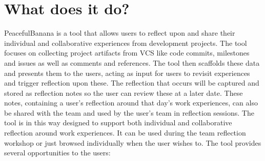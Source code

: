 \section{What does it do?}
PeacefulBanana is a tool that allows users to reflect upon and share their individual and collaborative experiences from development projects. The tool focuses on collecting project artifacts from VCS like code commits, milestones and issues as well as comments and references. The tool then scaffolds these data and presents them to the users, acting as input for users to revisit experiences and trigger reflection upon these. The reflection that occurs will be captured and stored as reflection notes so the user can review these at a later date. These notes, containing a user's reflection around that day's work experiences, can also be shared with the team and used by the user's team in reflection sessions. The tool is in this way designed to support both individual and collaborative reflection around work experiences. It can be used during the team reflection workshop or just browsed individually when the user wishes to. The tool provides several opportunities to the users:
